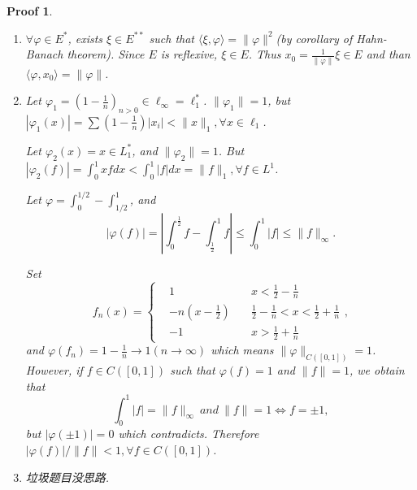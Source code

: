 \documentclass[hyperref,UTF8]{ctexart}
\newtheorem{pf}{Proof}[section]
\newcommand{\lrangle}[2]{\langle #1, #2 \rangle}
\begin{document}
\begin{pf}
    \begin{enumerate}
        \item $\forall \varphi\in E^*$, exists $\xi\in E^{**}$ such that $\lrangle{\xi}{\varphi} = \|\varphi\|^2$(by corollary of Hahn-Banach theorem). Since $E$ is reflexive, $\xi\in E$. Thus $x_0 = \frac1{\|\varphi\|}\xi\in E$ and than $\lrangle{\varphi}{x_0} = \|\varphi\|$. 
        \item Let $\varphi_1=(1-\frac1n)_{n > 0}\in \ell_\infty=\ell_1^*$. $\|\varphi_1\| = 1$, but  $|\varphi_1(x)| = \sum (1 - \frac1n)|x_i| < \|x\|_1, \forall x\in \ell_1$. 
        
        Let $\varphi_2(x) = x \in L_1^*$, and $\|\varphi_2\|=1$. But $|\varphi_2(f)| = \int_0^1 xf dx < \int_0^1 |f|dx = \|f\|_1, \forall f\in L^1$. 

        Let $\varphi = \int_0^{1/2} - \int_{1/2}^1$, and 
        \[ |\varphi(f)| = |\int_0^{\frac12}f - \int_{\frac{1}{2}}^1f |\leq \int_0^1|f|\leq\|f\|_\infty. \]

        Set 
        \[ f_n(x) = \left\{\begin{aligned}
            &1\quad &x < \frac12 - \frac1n\\
            &-n(x-\frac12)\quad&\frac12 - \frac1n < x < \frac12 + \frac1n\\
            &-1\quad &x > \frac12 + \frac1n
        \end{aligned}\right. ,\]
        and $\varphi(f_n) = 1 - \frac1n\to 1(n\to\infty)$ which means $\|\varphi\|_{C([0,1])} = 1$. However, if $f\in C([0, 1])$ such that $\varphi(f) = 1$ and $\|f\| = 1$, we obtain that 
        \[
            \int_0^1|f| = \|f\|_\infty \ and \ \|f\|=1 \iff f = \pm 1,
        \]
        but $|\varphi(\pm1)| = 0$ which contradicts. Therefore $|\varphi(f)|/\|f\| < 1, \forall f\in C([0, 1])$. 
        \item 垃圾题目没思路. 
    \end{enumerate}
\end{pf}\newpage
\end{document}
